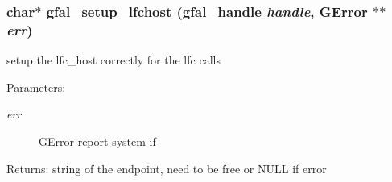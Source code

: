 \subsubsection{\setlength{\rightskip}{0pt plus 5cm}char$\ast$ gfal\_\-setup\_\-lfchost (gfal\_\-handle {\em handle}, GError $\ast$$\ast$ {\em err})}\label{lfc__ifce__ng_8c_5d13dc09e91f66d74de768c2e4bf4872}


setup the lfc\_\-host correctly for the lfc calls \begin{Desc}
\item[Parameters:]
\begin{description}
\item[{\em err}]GError report system if \end{description}
\end{Desc}
\begin{Desc}
\item[Returns:]string of the endpoint, need to be free or NULL if error \end{Desc}
